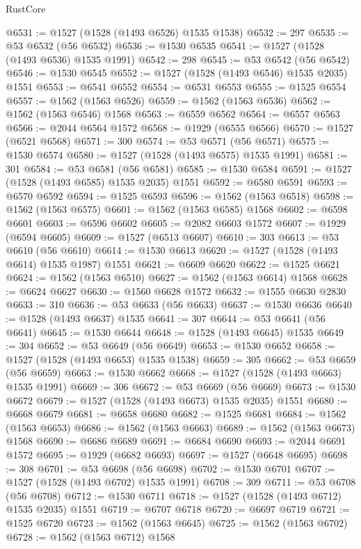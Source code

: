 \begin{lexlean}{RustCore}
\begin{coremodule}
@6531 := @1527 (@1528 (@1493 @6526) @1535 @1538)
@6532 := 297
@6535 := @53 @6532 (@56 @6532)
@6536 := @1530 @6535
@6541 := @1527 (@1528 (@1493 @6536) @1535 @1991)
@6542 := 298
@6545 := @53 @6542 (@56 @6542)
@6546 := @1530 @6545
@6552 := @1527 (@1528 (@1493 @6546) @1535 @2035) @1551
@6553 := @6541 @6552
@6554 := @6531 @6553
@6555 := @1525 @6554
@6557 := @1562 (@1563 @6526)
@6559 := @1562 (@1563 @6536)
@6562 := @1562 (@1563 @6546) @1568
@6563 := @6559 @6562
@6564 := @6557 @6563
@6566 := @2044 @6564 @1572
@6568 := @1929 (@6555 @6566)
@6570 := @1527 (@6521 @6568)
@6571 := 300
@6574 := @53 @6571 (@56 @6571)
@6575 := @1530 @6574
@6580 := @1527 (@1528 (@1493 @6575) @1535 @1991)
@6581 := 301
@6584 := @53 @6581 (@56 @6581)
@6585 := @1530 @6584
@6591 := @1527 (@1528 (@1493 @6585) @1535 @2035) @1551
@6592 := @6580 @6591
@6593 := @6570 @6592
@6594 := @1525 @6593
@6596 := @1562 (@1563 @6518)
@6598 := @1562 (@1563 @6575)
@6601 := @1562 (@1563 @6585) @1568
@6602 := @6598 @6601
@6603 := @6596 @6602
@6605 := @2082 @6603 @1572
@6607 := @1929 (@6594 @6605)
@6609 := @1527 (@6513 @6607)
@6610 := 303
@6613 := @53 @6610 (@56 @6610)
@6614 := @1530 @6613
@6620 := @1527 (@1528 (@1493 @6614) @1535 @1987) @1551
@6621 := @6609 @6620
@6622 := @1525 @6621
@6624 := @1562 (@1563 @6510)
@6627 := @1562 (@1563 @6614) @1568
@6628 := @6624 @6627
@6630 := @1560 @6628 @1572
@6632 := @1555 @6630 @2830
@6633 := 310
@6636 := @53 @6633 (@56 @6633)
@6637 := @1530 @6636
@6640 := @1528 (@1493 @6637) @1535
@6641 := 307
@6644 := @53 @6641 (@56 @6641)
@6645 := @1530 @6644
@6648 := @1528 (@1493 @6645) @1535
@6649 := 304
@6652 := @53 @6649 (@56 @6649)
@6653 := @1530 @6652
@6658 := @1527 (@1528 (@1493 @6653) @1535 @1538)
@6659 := 305
@6662 := @53 @6659 (@56 @6659)
@6663 := @1530 @6662
@6668 := @1527 (@1528 (@1493 @6663) @1535 @1991)
@6669 := 306
@6672 := @53 @6669 (@56 @6669)
@6673 := @1530 @6672
@6679 := @1527 (@1528 (@1493 @6673) @1535 @2035) @1551
@6680 := @6668 @6679
@6681 := @6658 @6680
@6682 := @1525 @6681
@6684 := @1562 (@1563 @6653)
@6686 := @1562 (@1563 @6663)
@6689 := @1562 (@1563 @6673) @1568
@6690 := @6686 @6689
@6691 := @6684 @6690
@6693 := @2044 @6691 @1572
@6695 := @1929 (@6682 @6693)
@6697 := @1527 (@6648 @6695)
@6698 := 308
@6701 := @53 @6698 (@56 @6698)
@6702 := @1530 @6701
@6707 := @1527 (@1528 (@1493 @6702) @1535 @1991)
@6708 := 309
@6711 := @53 @6708 (@56 @6708)
@6712 := @1530 @6711
@6718 := @1527 (@1528 (@1493 @6712) @1535 @2035) @1551
@6719 := @6707 @6718
@6720 := @6697 @6719
@6721 := @1525 @6720
@6723 := @1562 (@1563 @6645)
@6725 := @1562 (@1563 @6702)
@6728 := @1562 (@1563 @6712) @1568

\end{coremodule}
\end{lexlean}
